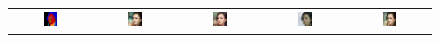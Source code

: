 \begin{figure}[]
\begin{tabular} {cc|cc|c}
\includegraphics[width=0.1932\textwidth]{Images/Rec/Faces/label/28181.png} & \includegraphics[width=0.1932\textwidth]{Images/Rec/Faces/gt/28181.jpg} &
\includegraphics[width=0.1932\textwidth]{Images/Rec/Faces/pix2pixhd/28181.jpg}&
\includegraphics[width=0.1932\textwidth]{Images/Rec/Faces/spade/28181.jpg} &  \includegraphics[width=0.1932\textwidth]{Images/Rec/Faces/ours/28181.png} \\




\end{tabular}
\end{figure}
